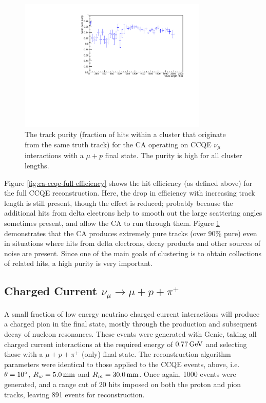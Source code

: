\begin{figure}
    \centering
    \includegraphics[angle=-90,width=0.8\textwidth]{chapters/cellularautomaton_images/ccqe-purity}
    \caption[Track purity for CCQE events reconstructed with a CA]{\label{fig:ca-ccqe-full-purity}The track purity (fraction of hits within a cluster that originate from the same truth track) for the CA operating on CCQE $\nu_\mu$ interactions with a $\mu + p$ final state. The purity is high for all cluster lengths.}
\end{figure}

Figure \ref{fig:ca-ccqe-full-efficiency} shows the hit efficiency (as defined above) for the full CCQE reconstruction. Here, the drop in efficiency with increasing track length is still present, though the effect is reduced; probably because the additional hits from delta electrons help to smooth out the large scattering angles sometimes present, and allow the \ac{CA} to run through them. Figure \ref{fig:ca-ccqe-full-purity} demonstrates that the \ac{CA} produces extremely pure tracks (over $90\%$ pure) even in situations where hits from delta electrons, decay products and other sources of noise are present. Since one of the main goals of clustering is to obtain collections of related hits, a high purity is very important.

\subsection{Charged Current $\nu_\mu \rightarrow \mu + p + \pi^+$}
A small fraction of low energy neutrino charged current interactions will produce a charged pion in the final state, mostly through the production and subsequent decay of nucleon resonances. These events were generated with Genie, taking all charged current interactions at the required energy of $0.77\,\mathrm{GeV}$ and selecting those with a $\mu + p + \pi^+$ (only) final state. The reconstruction algorithm parameters were identical to those applied to the \ac{CCQE} events, above, i.e. $\theta=10^\circ$, $R_w=5.0\,\mathrm{mm}$ and $R_m=30.0\,\mathrm{mm}$. Once again, 1000 events were generated, and a range cut of 20 hits imposed on both the proton and pion tracks, leaving 891 events for reconstruction.

